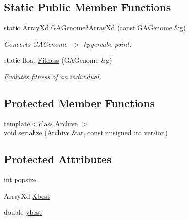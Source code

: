 \subsection*{Static Public Member Functions}
\begin{DoxyCompactItemize}
\item 
static Array\-Xd \hyperlink{class_c_g_a_model_optimization_a43c6ca120a99ced7c095dfc3c4422381}{G\-A\-Genome2\-Array\-Xd} (const G\-A\-Genome \&g)
\begin{DoxyCompactList}\small\item\em Converts G\-A\-Genome -\/$>$ hpyercube point. \end{DoxyCompactList}\item 
static float \hyperlink{class_c_g_a_model_optimization_a3da8eb17ef08ba4b3e87b8f7d902878e}{Fitness} (G\-A\-Genome \&g)
\begin{DoxyCompactList}\small\item\em Evalutes fitness of an individual. \end{DoxyCompactList}\end{DoxyCompactItemize}
\subsection*{Protected Member Functions}
\begin{DoxyCompactItemize}
\item 
{\footnotesize template$<$class Archive $>$ }\\void \hyperlink{class_c_g_a_model_optimization_ad2294cc27928439a39c86cc0899c4a15}{serialize} (Archive \&ar, const unsigned int version)
\end{DoxyCompactItemize}
\subsection*{Protected Attributes}
\begin{DoxyCompactItemize}
\item 
int \hyperlink{class_c_g_a_model_optimization_a630bb8f0d92f88da6923cabbe2dc6bbd}{popsize}
\item 
Array\-Xd \hyperlink{class_c_g_a_model_optimization_a20e94024ae32a632442dfb9de308c81e}{Xbest}
\item 
double \hyperlink{class_c_g_a_model_optimization_aa29eb539bc5208c83e5507942e45de91}{ybest}
\end{DoxyCompactItemize}
